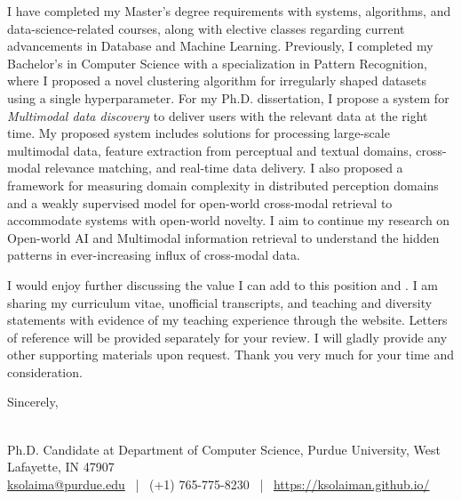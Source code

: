 \documentclass[11pt]{article}
\renewcommand*\paragraph[1]{}
\begin{document}
\paragraph{1 and P1) Earned doctoral degree in computer science or a closely related field}
I have completed my Master's degree requirements with systems, algorithms, and data-science-related courses, along with elective classes regarding current advancements in Database and Machine Learning. Previously, I completed my Bachelor's in Computer Science with a specialization in Pattern Recognition, where I proposed a novel clustering algorithm for irregularly shaped datasets using a single hyperparameter.
For my Ph.D. dissertation, I propose a system for \textit{Multimodal data discovery} to deliver users with the relevant data at the right time. My proposed system includes solutions for processing large-scale multimodal data, feature extraction from perceptual and textual domains, cross-modal relevance matching, and real-time data delivery. I also proposed a framework for measuring domain complexity in distributed perception domains and a weakly supervised model for open-world cross-modal retrieval to accommodate systems with open-world novelty. I aim to continue my research on Open-world AI and Multimodal information retrieval to understand the hidden patterns in ever-increasing influx of cross-modal data.


I would enjoy further discussing the value I can add to this position and \InstitutionName{}. I am sharing my curriculum vitae, unofficial transcripts, and teaching and diversity 
statements with evidence of my teaching experience 
through the website. Letters of reference will be provided separately for your review. I will gladly provide any other supporting materials upon request. Thank you very much for your time and consideration.


Sincerely, 


\Name{} \\
\normalsize  \textnormal{
          Ph.D. Candidate at Department of Computer Science, Purdue University, West Lafayette, IN 47907
        }\\
        \normalsize \textnormal{ %
          \href{mailto:ksolaima@purdue.edu}{ksolaima@purdue.edu} ~|~ %
          (+1) 765-775-8230 ~|~ %
          \href{https://ksolaiman.github.io/}{https://ksolaiman.github.io/}
}

\end{document}
